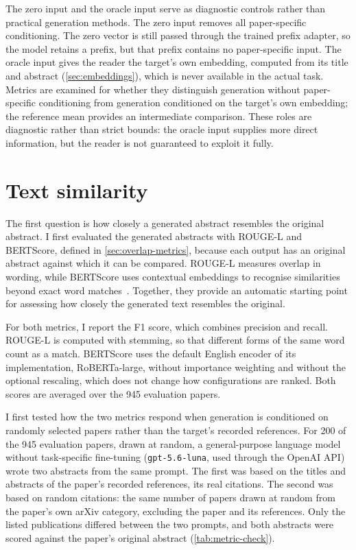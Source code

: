 The zero input and the oracle input serve as diagnostic controls rather than practical generation methods. The zero input removes all paper-specific conditioning. The zero vector is still passed through the trained prefix adapter, so the model retains a prefix, but that prefix contains no paper-specific input. The oracle input gives the reader the target's own embedding, computed from its title and abstract (\autoref{sec:embeddings}), which is never available in the actual task. Metrics are examined for whether they distinguish generation without paper-specific conditioning from generation conditioned on the target's own embedding; the reference mean provides an intermediate comparison. These roles are diagnostic rather than strict bounds: the oracle input supplies more direct information, but the reader is not guaranteed to exploit it fully.

\section{Text similarity}
\label{sec:text-similarity}

The first question is how closely a generated abstract resembles the original abstract. I first evaluated the generated abstracts with ROUGE-L and BERTScore, defined in \autoref{sec:overlap-metrics}, because each output has an original abstract against which it can be compared. ROUGE-L measures overlap in wording, while BERTScore uses contextual embeddings to recognise similarities beyond exact word matches~\cite{zhang2020bertscore}. Together, they provide an automatic starting point for assessing how closely the generated text resembles the original.

For both metrics, I report the F1 score, which combines precision and recall. ROUGE-L is computed with stemming, so that different forms of the same word count as a match. BERTScore uses the default English encoder of its implementation, RoBERTa-large, without importance weighting and without the optional rescaling, which does not change how configurations are ranked. Both scores are averaged over the 945 evaluation papers.

I first tested how the two metrics respond when generation is conditioned on randomly selected papers rather than the target's recorded references. For 200 of the 945 evaluation papers, drawn at random, a general-purpose language model without task-specific fine-tuning (\texttt{gpt-5.6-luna}, used through the OpenAI API) wrote two abstracts from the same prompt. The first was based on the titles and abstracts of the paper's recorded references, its real citations. The second was based on random citations: the same number of papers drawn at random from the paper's own arXiv category, excluding the paper and its references. Only the listed publications differed between the two prompts, and both abstracts were scored against the paper's original abstract (\autoref{tab:metric-check}).


